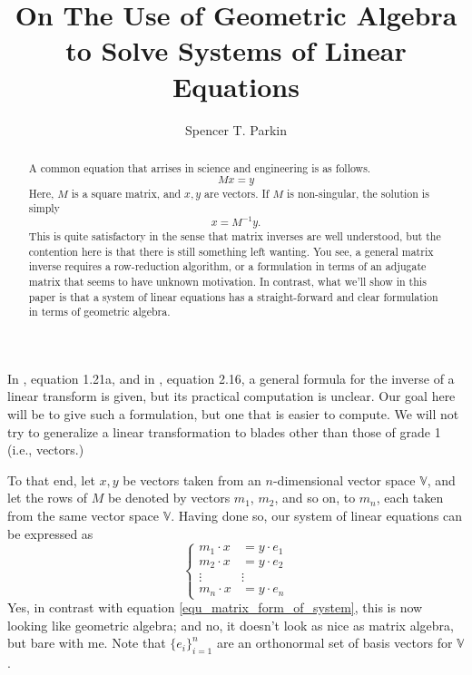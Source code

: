 \documentclass{birkjour}
\title{On The Use of Geometric Algebra\\to Solve Systems of Linear Equations}
\author{Spencer T. Parkin}
\newcommand{\V}{\mathbb{V}}
\begin{document}
\maketitle

\begin{abstract}
A common equation that arrises in science and engineering is as follows.
\begin{equation}\label{equ_matrix_form_of_system}
Mx=y
\end{equation}
Here, $M$ is a square matrix, and $x,y$ are vectors.  If $M$ is non-singular, the solution is simply
\begin{equation}\label{equ_matrix_algebra_solved}
x=M^{-1}y.
\end{equation}
This is quite satisfactory in the sense that matrix inverses are well understood, but the contention here is that
there is still something left wanting.  You see, a general matrix inverse requires a row-reduction algorithm, or
a formulation in terms of an adjugate matrix that seems to have unknown motivation.  In contrast, what we'll show in this paper is that a
system of linear equations has a straight-forward and clear formulation in terms of geometric algebra.
\end{abstract}

In \cite{Hestenes84}, equation 1.21a, and in \cite{Hestenes91}, equation 2.16, a general formula for the inverse of a linear transform is given,
but its practical computation is unclear.  Our goal here will be to give such a formulation, but one that
is easier to compute.  We will not try to generalize a linear transformation to blades other than those of grade 1 (i.e., vectors.)

To that end, let $x,y$ be vectors taken from an $n$-dimensional vector space $\V$, and let the rows of $M$
be denoted by vectors $m_1$, $m_2$, and so on, to $m_n$, each taken from the same vector space $\V$.
Having done so, our system of linear equations can be expressed as
\begin{equation}\label{equ_linear_system}
\left\{
\begin{array}{cc}
m_1\cdot x &= y\cdot e_1 \\
m_2\cdot x &= y\cdot e_2 \\
\vdots & \vdots \\
m_n\cdot x &= y\cdot e_n
\end{array}
\right.
\end{equation}
Yes, in contrast with equation \eqref{equ_matrix_form_of_system}, this is now looking like geometric algebra; and no, it doesn't look as nice as matrix algebra,
but bare with me.  Note that $\{e_i\}_{i=1}^n$ are an orthonormal set of basis vectors for $\V$.
\end{document}
